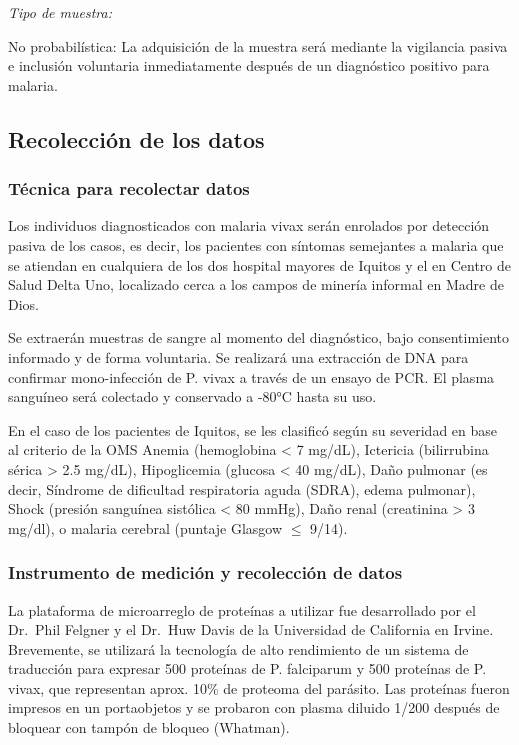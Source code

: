 \documentclass[]{article}
\begin{document}
\emph{Tipo de muestra:}

No probabilística: La adquisición de la muestra será mediante la
vigilancia pasiva e inclusión voluntaria inmediatamente después de un
diagnóstico positivo para malaria.

\subsection{Recolección de los datos}\label{recoleccion-de-los-datos}

\subsubsection{Técnica para recolectar
datos}\label{tecnica-para-recolectar-datos}

Los individuos diagnosticados con malaria vivax serán enrolados por
detección pasiva de los casos, es decir, los pacientes con síntomas
semejantes a malaria que se atiendan en cualquiera de los dos hospital
mayores de Iquitos y el en Centro de Salud Delta Uno, localizado cerca a
los campos de minería informal en Madre de Dios.

Se extraerán muestras de sangre al momento del diagnóstico, bajo
consentimiento informado y de forma voluntaria. Se realizará una
extracción de DNA para confirmar mono-infección de P. vivax a través de
un ensayo de PCR. El plasma sanguíneo será colectado y conservado a
-80°C hasta su uso.

En el caso de los pacientes de Iquitos, se les clasificó según su
severidad en base al criterio de la OMS Anemia (hemoglobina \textless{}
7 mg/dL), Ictericia (bilirrubina sérica \textgreater{} 2.5 mg/dL),
Hipoglicemia (glucosa \textless{} 40 mg/dL), Daño pulmonar (es decir,
Síndrome de dificultad respiratoria aguda (SDRA), edema pulmonar), Shock
(presión sanguínea sistólica \textless{} 80 mmHg), Daño renal
(creatinina \textgreater{} 3 mg/dl), o malaria cerebral (puntaje Glasgow
\(\le\) 9/14).

\subsubsection{Instrumento de medición y recolección de
datos}\label{instrumento-de-medicion-y-recoleccion-de-datos}

La plataforma de microarreglo de proteínas a utilizar fue desarrollado
por el Dr.~Phil Felgner y el Dr.~Huw Davis de la Universidad de
California en Irvine. Brevemente, se utilizará la tecnología de alto
rendimiento de un sistema de traducción para expresar 500 proteínas de
P. falciparum y 500 proteínas de P. vivax, que representan aprox. 10\%
de proteoma del parásito. Las proteínas fueron impresos en un
portaobjetos y se probaron con plasma diluido 1/200 después de bloquear
con tampón de bloqueo (Whatman).
\end{document}
